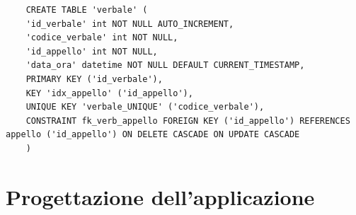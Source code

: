 \documentclass[a4paper,12pt]{scrreprt}
\begin{document}


\begin{lstlisting}
    CREATE TABLE 'verbale' (
    'id_verbale' int NOT NULL AUTO_INCREMENT,
    'codice_verbale' int NOT NULL,
    'id_appello' int NOT NULL,
    'data_ora' datetime NOT NULL DEFAULT CURRENT_TIMESTAMP,
    PRIMARY KEY ('id_verbale'),
    KEY 'idx_appello' ('id_appello'),
    UNIQUE KEY 'verbale_UNIQUE' ('codice_verbale'),
    CONSTRAINT fk_verb_appello FOREIGN KEY ('id_appello') REFERENCES appello ('id_appello') ON DELETE CASCADE ON UPDATE CASCADE
    )
\end{lstlisting}

\newpage

\chapter{Progettazione dell'applicazione}
\end{document}
